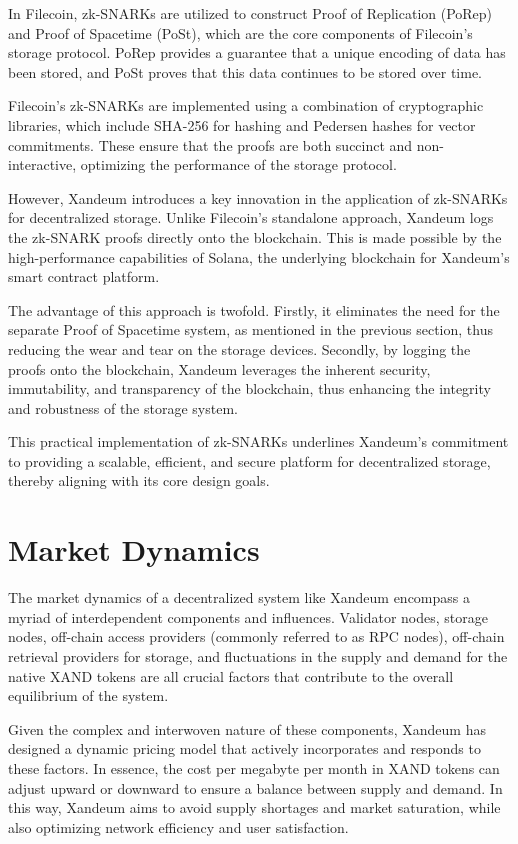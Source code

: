 \documentclass[11pt]{article}   	%
\let\oldsection\section
\renewcommand{\section}{\clearpage\oldsection}
\begin{document}
In Filecoin, zk-SNARKs are utilized to construct Proof of Replication (PoRep) and Proof of Spacetime (PoSt), which are the core components of Filecoin's storage protocol. PoRep provides a guarantee that a unique encoding of data has been stored, and PoSt proves that this data continues to be stored over time.

Filecoin's zk-SNARKs are implemented using a combination of cryptographic libraries, which include SHA-256 for hashing and Pedersen hashes for vector commitments. These ensure that the proofs are both succinct and non-interactive, optimizing the performance of the storage protocol.

However, Xandeum introduces a key innovation in the application of zk-SNARKs for decentralized storage. Unlike Filecoin's standalone approach, Xandeum logs the zk-SNARK proofs directly onto the blockchain. This is made possible by the high-performance capabilities of Solana, the underlying blockchain for Xandeum's smart contract platform.

The advantage of this approach is twofold. Firstly, it eliminates the need for the separate Proof of Spacetime system, as mentioned in the previous section, thus reducing the wear and tear on the storage devices. Secondly, by logging the proofs onto the blockchain, Xandeum leverages the inherent security, immutability, and transparency of the blockchain, thus enhancing the integrity and robustness of the storage system.

This practical implementation of zk-SNARKs underlines Xandeum's commitment to providing a scalable, efficient, and secure platform for decentralized storage, thereby aligning with its core design goals.

\section{Market Dynamics}
The market dynamics of a decentralized system like Xandeum encompass a myriad of interdependent components and influences. Validator nodes, storage nodes, off-chain access providers (commonly referred to as RPC nodes), off-chain retrieval providers for storage, and fluctuations in the supply and demand for the native XAND tokens are all crucial factors that contribute to the overall equilibrium of the system.

Given the complex and interwoven nature of these components, Xandeum has designed a dynamic pricing model that actively incorporates and responds to these factors. In essence, the cost per megabyte per month in XAND tokens can adjust upward or downward to ensure a balance between supply and demand. In this way, Xandeum aims to avoid supply shortages and market saturation, while also optimizing network efficiency and user satisfaction.
\end{document}
